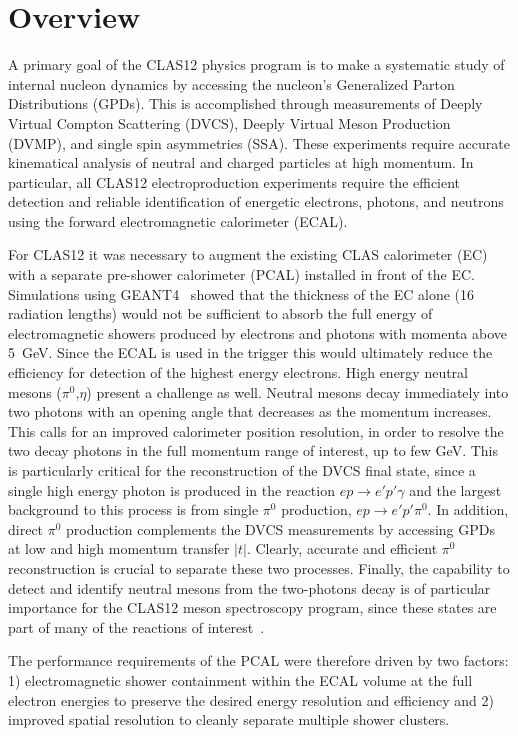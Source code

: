 \section{Overview}

A primary goal of the CLAS12 physics program is to make a systematic study of internal nucleon dynamics by
accessing the nucleon's Generalized Parton Distributions (GPDs). This is accomplished through measurements of
Deeply Virtual Compton Scattering (DVCS), Deeply Virtual Meson Production (DVMP), and single spin asymmetries
(SSA). These experiments require accurate kinematical analysis of neutral and charged particles at high momentum.
In particular, all CLAS12 electroproduction experiments require the efficient detection and reliable identification
of energetic electrons, photons, and neutrons using the forward electromagnetic calorimeter (ECAL).

For CLAS12 it was necessary to augment the existing CLAS calorimeter (EC)~\cite{clas6nim} with a separate
pre-shower calorimeter (PCAL) installed in front of the EC. Simulations using GEANT4~\cite{nim:sim} showed that the thickness
of the EC alone (16 radiation lengths) would not be sufficient to absorb the full energy of electromagnetic showers
produced by electrons and photons with momenta above 5~GeV. Since the ECAL is used in the trigger this would
ultimately reduce the efficiency for detection of the highest energy electrons. High energy neutral mesons
($\pi^{0}$,$\eta$) present a challenge as well. Neutral mesons decay immediately into two photons with an
opening angle that decreases as the momentum increases. This calls for an improved calorimeter position resolution, in order to resolve the two decay photons in the full momentum range of interest, up to few GeV.  This is particularly critical for the reconstruction
of the DVCS final state, since a single high energy photon is produced in the reaction $ep \to e'p'\gamma$ and the
largest background to this process is from single $\pi^{0}$ production, $ep \to e'p'\pi^{0}$. In addition, direct
$\pi^{0}$ production complements the DVCS measurements by accessing GPDs at low and high momentum transfer
$|t|$. Clearly, accurate and efficient $\pi^{0}$ reconstruction is crucial to separate these two processes. Finally, the capability to detect and identify neutral mesons from the two-photons decay is of particular importance for the CLAS12 meson spectroscopy program, since these states are part of many of the reactions of interest~\cite{MesonSpec}.

The performance requirements of the PCAL were therefore driven by two factors: 1) electromagnetic shower
containment within the ECAL volume at the full electron energies to preserve the desired energy resolution and
efficiency and 2) improved spatial resolution to cleanly separate multiple shower clusters.  




